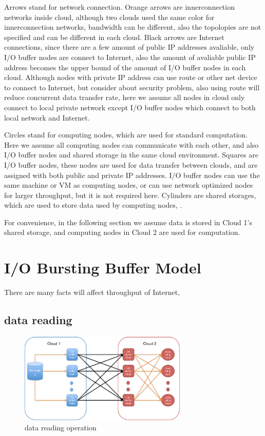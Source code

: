 \documentclass[JIP,draft]{ipsj}
\begin{document}
Arrows stand for network connection.
Orange arrows are innerconnection networks inside cloud, although two clouds used the same color for innerconnection networks, bandwidth can be different, also the topolopies are not specified and can be different in each cloud.
Black arrows are Internet connections, since there are a few amount of public IP addresses avaliable, only I/O buffer nodes are connect to Internet, also the amount of avaliable public IP address becomes the upper bound of the amount of I/O buffer nodes in each cloud. 
Although nodes with private IP address can use route or other net device to connect to Internet, but consider about security problem, also using route will reduce concurrent data transfer rate, here we assume all nodes in cloud only connect to local private network except I/O buffer nodes which connect to both local network and Internet.

Circles stand for computing nodes, which are used for standard computation.
Here we assume all computing nodes can communicate with each other, and also I/O buffer nodes and shared storage in the same cloud environment.
Squares are I/O buffer nodes, these nodes are used for data transfer between clouds, and are assigned with both public and private IP addresses.
I/O buffer nodes can use the same machine or VM as computing nodes, or can use network optimized nodes for larger throughput, but it is not required here.
Cylinders are shared storages, which are used to store data used by computing nodes, .

For convenience, in the following section we assume data is stored in Cloud 1's shared storage, and computing nodes in Cloud 2 are used for computation. 

\section{I/O Bursting Buffer Model}

There are many facts will affect throughput of Internet, 

\subsection{data reading}

\begin{figure}[tb]
	\centering
	\includegraphics[width=8cm]{reading}
	\caption{data reading operation}
	\label{reading}
\end{figure}
\end{document}
